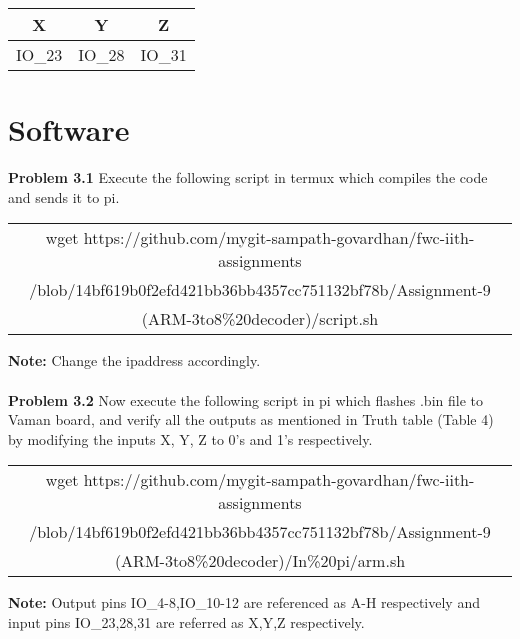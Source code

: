 \documentclass[journal,12pt,twocolumn]{IEEEtran}
\begin{document}
    \begin{table}[h]
    \centering
    \begin{tabular}{| c | c | c |}
    \hline
    \textbf{X} & \textbf{Y} & \textbf{Z} \\
    \hline
    IO\_23 & IO\_28 & IO\_31  \\
    \hline
    \end{tabular}
    \caption{}
    \label{tab:my_label}
 \end{table}


\section{Software}
\textbf{Problem 3.1} Execute the following script in termux which compiles the code and sends it to pi. \\
\vspace{1cm}
\begin{table}[h]
    \centering
    \begin{tabular}{| c |}
    \hline
    wget https://github.com/mygit-sampath-govardhan/fwc-iith-assignments\\/blob/14bf619b0f2efd421bb36bb4357cc751132bf78b/Assignment-9\\(ARM-3to8\%20decoder)/script.sh\\
    \hline
    \end{tabular}
\end{table}
\textbf{Note:} Change the ipaddress accordingly.\\
\\
\textbf{Problem 3.2} Now execute the following script in pi which flashes .bin file to Vaman board, and verify all the outputs as mentioned in Truth table (Table 4) by modifying the inputs X, Y, Z to 0's and 1's respectively. \\
\begin{table}[h]
    \centering
    \begin{tabular}{| c |}
    \hline
    wget https://github.com/mygit-sampath-govardhan/fwc-iith-assignments\\/blob/14bf619b0f2efd421bb36bb4357cc751132bf78b/Assignment-9\\(ARM-3to8\%20decoder)/In\%20pi/arm.sh\\
    \hline
    \end{tabular}
\end{table}

\textbf{Note:} Output pins IO\_4-8,IO\_10-12 are referenced as A-H respectively and input pins IO\_23,28,31 are referred as X,Y,Z respectively.\\
\end{document}
